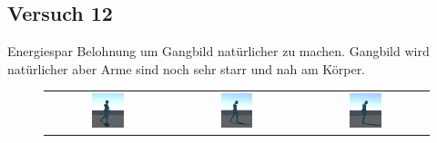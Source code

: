 \subsection{Versuch 12}
Energiespar Belohnung um Gangbild natürlicher zu machen. Gangbild wird natürlicher aber Arme sind noch sehr starr und nah am Körper.

\begin{figure}[H]
  \centering
  \begin{tabular}{ccc}
    \includegraphics[width=0.27\textwidth]{img/mixamo_laufen_energiespar1.png} & \includegraphics[width=0.27\textwidth]{img/mixamo_laufen_energiespar2.png}  & \includegraphics[width=0.27\textwidth]{img/mixamo_laufen_energiespar3.png} \\

\end{tabular}
\end{figure}
